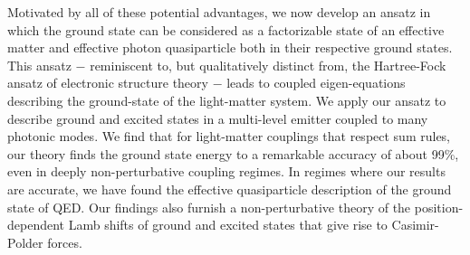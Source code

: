 \documentclass[aps,prl,twocolumn,
	groupedaddress,superscriptaddress,
	amsfonts,amssymb,amsmath,floatfix,
	citeautoscript]{revtex4-1}
\newcommand{\Jadd}[1]{\textcolor{blue}{#1}}
\begin{document}
Motivated by all of these potential advantages, we now develop an ansatz in which the ground state can be considered as a factorizable state of an effective matter and effective photon quasiparticle both in their respective ground states. This ansatz $-$ reminiscent to, but qualitatively distinct from, the Hartree-Fock ansatz of electronic structure theory $-$ leads to coupled eigen-equations describing the ground-state of the light-matter system. We apply our ansatz to describe ground and excited states in a multi-level emitter coupled to many photonic modes. We find that for light-matter couplings that respect sum rules, our theory finds the ground state energy to a remarkable accuracy of about 99\%, even in deeply non-perturbative coupling regimes.  In regimes where our results are accurate, we have found the effective quasiparticle description of the ground state of QED.  Our findings also furnish a non-perturbative theory of the position-dependent Lamb shifts of ground and excited states that give rise to Casimir-Polder forces.


\end{document}
